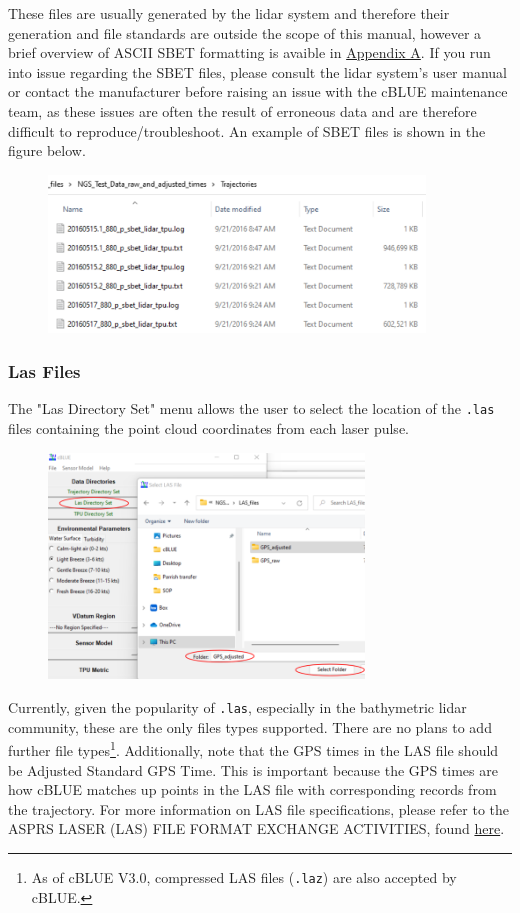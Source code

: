 \documentclass[11pt, a4paper]{article}
\begin{document}
These files are usually generated by the lidar system and therefore their generation and file standards are outside the scope of this manual, however a brief overview of ASCII SBET formatting is avaible in \hyperref[appendix:SBET]{Appendix A}. If you run into issue regarding the SBET files, please consult the lidar system's user manual or contact the manufacturer before raising an issue with the cBLUE maintenance team, as these issues are often the result of erroneous data and are therefore difficult to reproduce/troubleshoot. An example of SBET files is shown in the figure below.

\begin{figure}[H]
    \centering
    \includegraphics[width=10cm]{figs/example_data.png}
\end{figure}


\subsubsection{Las Files}
The "Las Directory Set" menu allows the user to select the location of the \texttt{.las} files containing the point cloud coordinates from each laser pulse. 

\begin{figure}[H]
    \centering
    \includegraphics[height=6cm]{figs/select_las.png}
\end{figure}

Currently, given the popularity of \texttt{.las}, especially in the bathymetric lidar community, these are the only files types supported. There are no plans to add further file types\footnote{As of cBLUE V3.0, compressed LAS files (\texttt{.laz}) are also accepted by cBLUE.}. Additionally, note that the GPS times in the LAS file should be Adjusted Standard GPS Time. This is important because the GPS times are how cBLUE matches up points in the LAS file with corresponding records from the trajectory. For more information on LAS file specifications, please refer to the ASPRS LASER (LAS) FILE FORMAT EXCHANGE ACTIVITIES, found \href{https://www.asprs.org/divisions-committees/lidar-division/laser-las-file-format-exchange-activities}{here}.
\end{document}

